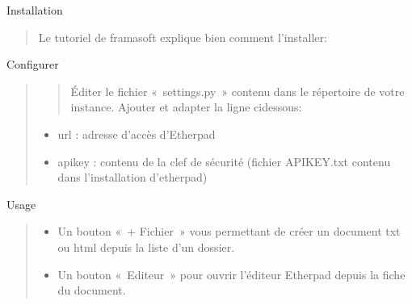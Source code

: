 \documentclass[letterpaper,10pt,french]{sphinxmanual}
\begin{document}
\sphinxAtStartPar
Installation
\begin{quote}

\sphinxAtStartPar
Le tutoriel de framasoft explique bien comment l’installer: 
\end{quote}

\sphinxAtStartPar
Configurer
\begin{quote}
\begin{quote}

\sphinxAtStartPar
Éditer le fichier « settings.py » contenu dans le répertoire de votre instance.
Ajouter et adapter la ligne ci\sphinxhyphen{}dessous:
\end{quote}
\begin{itemize}
\item {} 
\sphinxAtStartPar
url : adresse d’accès d’Etherpad

\item {} 
\sphinxAtStartPar
apikey : contenu de la clef de sécurité (fichier APIKEY.txt contenu dans l’installation d’etherpad)

\end{itemize}
\end{quote}

\begin{sphinxVerbatim}[commandchars=\\\{\}]
     
\end{sphinxVerbatim}

\sphinxAtStartPar
Usage
\begin{quote}
\begin{description}
\begin{itemize}
\item {} 
\sphinxAtStartPar
Un bouton « + Fichier » vous permettant de créer un document txt ou html depuis la liste d’un dossier.

\item {} 
\sphinxAtStartPar
Un bouton « Editeur » pour ouvrir l’éditeur Etherpad depuis la fiche du document.

\end{itemize}

\end{description}
\end{quote}
\end{document}
